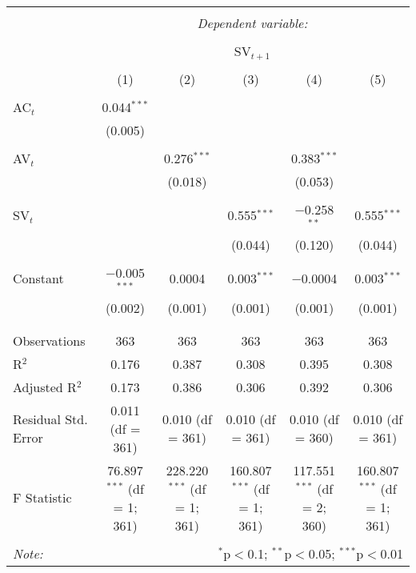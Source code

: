 
\begin{table}[!htbp] \centering 
  \caption{} 
  \label{} 
\begin{tabular}{@{\extracolsep{5pt}}lccccc} 
\\[-1.8ex]\hline 
\hline \\[-1.8ex] 
 & \multicolumn{5}{c}{\textit{Dependent variable:}} \\ 
\cline{2-6} 
\\[-1.8ex] & \multicolumn{5}{c}{SV$_{t+1}$} \\ 
\\[-1.8ex] & (1) & (2) & (3) & (4) & (5)\\ 
\hline \\[-1.8ex] 
 AC$_{t}$ & 0.044$^{***}$ &  &  &  &  \\ 
  & (0.005) &  &  &  &  \\ 
  & & & & & \\ 
 AV$_{t}$ &  & 0.276$^{***}$ &  & 0.383$^{***}$ &  \\ 
  &  & (0.018) &  & (0.053) &  \\ 
  & & & & & \\ 
 SV$_{t}$ &  &  & 0.555$^{***}$ & $-$0.258$^{**}$ & 0.555$^{***}$ \\ 
  &  &  & (0.044) & (0.120) & (0.044) \\ 
  & & & & & \\ 
 Constant & $-$0.005$^{***}$ & 0.0004 & 0.003$^{***}$ & $-$0.0004 & 0.003$^{***}$ \\ 
  & (0.002) & (0.001) & (0.001) & (0.001) & (0.001) \\ 
  & & & & & \\ 
\hline \\[-1.8ex] 
Observations & 363 & 363 & 363 & 363 & 363 \\ 
R$^{2}$ & 0.176 & 0.387 & 0.308 & 0.395 & 0.308 \\ 
Adjusted R$^{2}$ & 0.173 & 0.386 & 0.306 & 0.392 & 0.306 \\ 
Residual Std. Error & 0.011 (df = 361) & 0.010 (df = 361) & 0.010 (df = 361) & 0.010 (df = 360) & 0.010 (df = 361) \\ 
F Statistic & 76.897$^{***}$ (df = 1; 361) & 228.220$^{***}$ (df = 1; 361) & 160.807$^{***}$ (df = 1; 361) & 117.551$^{***}$ (df = 2; 360) & 160.807$^{***}$ (df = 1; 361) \\ 
\hline 
\hline \\[-1.8ex] 
\textit{Note:}  & \multicolumn{5}{r}{$^{*}$p$<$0.1; $^{**}$p$<$0.05; $^{***}$p$<$0.01} \\ 
\end{tabular} 
\end{table} 
